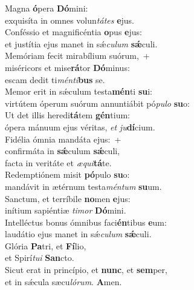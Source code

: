 \evenverse Magna \textbf{ó}pera \textbf{Dó}mini:~\*\\
\evenverse exquisíta in omnes volun\textit{tá}\textit{tes} \textbf{e}jus.\\
\oddverse Conféssio et magnificéntia \textbf{o}pus \textbf{e}jus:~\*\\
\oddverse et justítia ejus manet in sǽ\textit{cu}\textit{lum} \textbf{sǽ}culi.\\
\evenverse Memóriam fecit mirabílium suórum,~+\\
\evenverse  miséricors et mise\textbf{rá}tor \textbf{Dó}minus:~\*\\
\evenverse escam dedit ti\textit{mén}\textit{ti}\textbf{bus} se.\\
\oddverse Memor erit in sǽculum testa\textbf{mén}ti \textbf{su}i:~\*\\
\oddverse virtútem óperum suórum annuntiábit pó\textit{pu}\textit{lo} \textbf{su}o:\\
\evenverse Ut det illis heredi\textbf{tá}tem \textbf{gén}tium:~\*\\
\evenverse ópera mánuum ejus véritas, \textit{et} \textit{ju}\textbf{dí}cium.\\
\oddverse Fidélia ómnia mandáta ejus:~+\\
\oddverse  confirmáta in \textbf{sǽ}culum \textbf{sǽ}culi,~\*\\
\oddverse facta in veritáte et \textit{æ}\textit{qui}\textbf{tá}te.\\
\evenverse Redemptiónem misit \textbf{pó}pulo \textbf{su}o:~\*\\
\evenverse mandávit in ætérnum testa\textit{mén}\textit{tum} \textbf{su}um.\\
\oddverse Sanctum, et terríbile \textbf{no}men \textbf{e}jus:~\*\\
\oddverse inítium sapiéntiæ \textit{ti}\textit{mor} \textbf{Dó}mini.\\
\evenverse Intelléctus bonus ómnibus faci\textbf{én}tibus \textbf{e}um:~\*\\
\evenverse laudátio ejus manet in sǽ\textit{cu}\textit{lum} \textbf{sǽ}culi.\\
\oddverse Glória \textbf{Pa}tri, et \textbf{Fí}lio,~\*\\
\oddverse et Spirí\textit{tu}\textit{i} \textbf{San}cto.\\
\evenverse Sicut erat in princípio, et \textbf{nunc}, et \textbf{sem}per,~\*\\
\evenverse et in sǽcula sæcu\textit{ló}\textit{rum}. \textbf{A}men.\\
